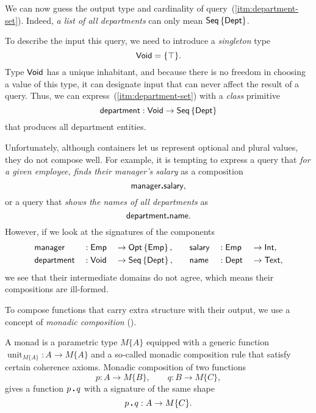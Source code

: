 We can now guess the output type and cardinality of
query~(\ref{itm:department-set}).  Indeed, \emph{a list of all departments}
can only mean $\textup{\textsf{Seq}}\left\{\textup{\textsf{Dept}}\right\}$.

To describe the input this query, we need to introduce a \emph{singleton} type
\begin{equation*}
    \textup{\textsf{Void}} = \{\top\}.
\end{equation*}
Type $\textup{\textsf{Void}}$ has a unique inhabitant, and because there is no freedom in
choosing a value of this type, it can designate input that can never affect the
result of a query.  Thus, we can express~(\ref{itm:department-set}) with a
\emph{class} primitive
\begin{equation*}
    \textup{\textsf{department}} : \textup{\textsf{Void}} \to \textup{\textsf{Seq}}\left\{\textup{\textsf{Dept}}\right\}
\end{equation*}
that produces all department entities.

Unfortunately, although containers let us represent optional and plural values,
they do not compose well.  For example, it is tempting to express a query that
\emph{for a given employee, finds their manager's salary} as a composition
\begin{equation} \label{eq:manager-to-salary}
    \textup{\textsf{manager}}\boldsymbol{.}\textup{\textsf{salary}},
\end{equation}
or a query that \emph{shows the names of all departments} as
\begin{equation} \label{eq:department-to-name}
    \textup{\textsf{department}}\boldsymbol{.}\textup{\textsf{name}}.
\end{equation}
However, if we look at the signatures of the components
\begin{alignat*}{6}
    & \textup{\textsf{manager}} && : \textup{\textsf{Emp}} && \to \textup{\textsf{Opt}}\left\{\textup{\textsf{Emp}}\right\}, \quad && \textup{\textsf{salary}} && : \textup{\textsf{Emp}} && \to \textup{\textsf{Int}}, \\
    & \textup{\textsf{department}} && : \textup{\textsf{Void}} && \to \textup{\textsf{Seq}}\left\{\textup{\textsf{Dept}}\right\}, \quad && \textup{\textsf{name}} && : \textup{\textsf{Dept}} && \to \textup{\textsf{Text}},
\end{alignat*}
we see that their intermediate domains do not agree, which means their
compositions are ill-formed.

To compose functions that carry extra structure with their output, we use a
concept of \emph{monadic composition} (\cite{Moggi1991}).

A monad is a parametric type $M\{A\}$ equipped with a generic function
$\operatorname{unit}_{M\{A\}} : A \to M\{A\}$ and a so-called monadic
composition rule that satisfy certain coherence axioms.  Monadic
composition of two functions
\begin{equation*}
    p : A \to M\{B\}, \qquad q : B \to M\{C\},
\end{equation*}
gives a function $p\,\boldsymbol{.}\,q$ with a signature of the same shape
\begin{equation*}
    p\,\boldsymbol{.}\,q : A \to M\{C\}.
\end{equation*}

